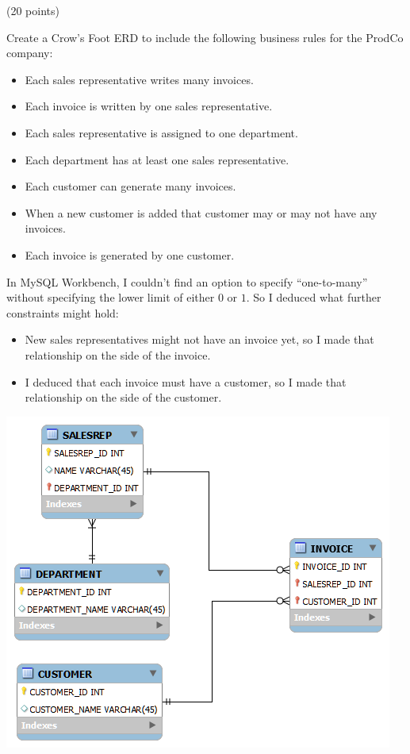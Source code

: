 \begin{problem} (20 points)
  
  \noindent
  Create a Crow’s Foot ERD to include the following business rules for the ProdCo company:
    \begin{itemize}
      \item Each sales representative writes many invoices.
      \item Each invoice is written by one sales representative.
      \item Each sales representative is assigned to one department.
      \item Each department has at least one sales representative.
      \item Each customer can generate many invoices.
      \item When a new customer is added that customer may or may not have any invoices.
      \item Each invoice is generated by one customer.
    \end{itemize}
\end{problem}
\begin{Answer}
  In MySQL Workbench, I couldn't find an option
  to specify ``one-to-many'' without specifying the lower
  limit of either $0$ or $1$.
  So I deduced what further constraints might hold:
  
  \begin{itemize}
    \item New sales representatives might not have an invoice yet, so
    I made that relationship  on the side of the invoice.
    \item I deduced that each invoice must have a customer, so I made
    that relationship  on the side of the customer.
  \end{itemize}
  \bigskip
  \centering
  \includegraphics[scale=0.8]{res/erd.png}
\end{Answer}
